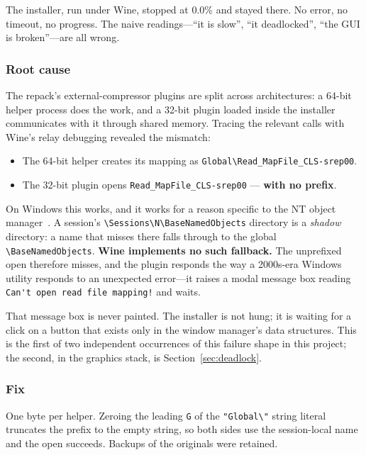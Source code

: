 The installer, run under Wine, stopped at 0.0\% and stayed there. No error, no
timeout, no progress. The naive readings---``it is slow'', ``it deadlocked'',
``the GUI is broken''---are all wrong.

\subsubsection{Root cause}

The repack's external-compressor plugins are split across architectures: a 64-bit
helper process does the work, and a 32-bit plugin loaded inside the installer
communicates with it through shared memory. Tracing the relevant calls with
Wine's relay debugging revealed the mismatch:

\begin{itemize}
\item The 64-bit helper creates its mapping as
      \verb|Global\Read_MapFile_CLS-srep00|.
\item The 32-bit plugin opens \verb|Read_MapFile_CLS-srep00| --- \textbf{with no
      prefix}.
\end{itemize}

On Windows this works, and it works for a reason specific to the NT object
manager~\cite{ntobj}. A session's \verb|\Sessions\N\BaseNamedObjects| directory
is a \emph{shadow} directory: a name that misses there falls through to the
global \verb|\BaseNamedObjects|. \textbf{Wine implements no such fallback.} The
unprefixed open therefore misses, and the plugin responds the way a 2000s-era
Windows utility responds to an unexpected error---it raises a modal message box
reading \verb|Can't open read file mapping!| and waits.

That message box is never painted. The installer is not hung; it is waiting for a
click on a button that exists only in the window manager's data structures. This
is the first of two independent occurrences of this failure shape in this
project; the second, in the graphics stack, is Section~\ref{sec:deadlock}.

\subsubsection{Fix}

One byte per helper. Zeroing the leading \verb|G| of the \verb|"Global\"| string
literal truncates the prefix to the empty string, so both sides use the
session-local name and the open succeeds. Backups of the originals were retained.

